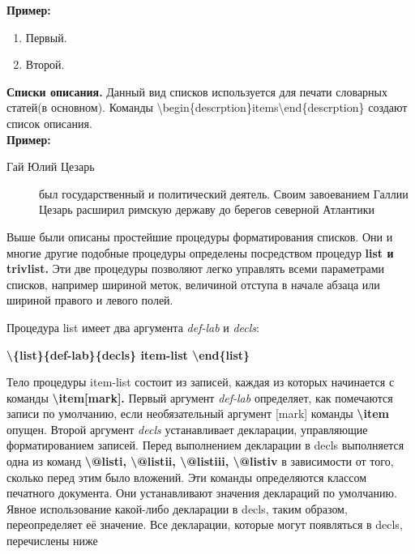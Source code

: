 \documentclass[a4paper,14pt,russian]{extreport}
\begin{document}
\newpage

\textbf{Пример:}
\begin{enumerate}%
\item Первый.%
\item Второй.%
\end{enumerate}%

\textbf{Списки описания.}
Данный вид списков используется для печати словарных статей(в основном). Команды \textbackslash begin\{descrption\}items\textbackslash end\{descrption\}
создают список описания.\\
\textbf{Пример:}
\begin{description} %
\item[Гай Юлий Цезарь] был государственный и политический деятель.
  Своим завоеванием Галлии Цезарь расширил римскую державу до берегов северной Атлантики
\end{description} %


Выше были описаны простейшие процедуры форматирования списков. Они и многие другие подобные процедуры определены посредством процедур \textbf{list и trivlist.} Эти две процедуры позволяют легко управлять всеми параметрами списков, например шириной меток, величиной отступа в начале абзаца или шириной правого и левого полей.

Процедура list имеет два аргумента \textit{def-lab} и \textit{decls}:

\bigskip
\textbf{\textbackslash \{list\}\{def-lab\}\{decls\} item-list \textbackslash end\{list\}}
\bigskip

Тело процедуры item-list состоит из записей, каждая из которых начинается с команды \textbf{\textbackslash item[mark].} Первый аргумент \textit{def-lab} определяет, как помечаются записи по умолчанию, если необязательный аргумент [mark] команды \textbf{\textbackslash item} опущен. Второй аргумент \textit{decls} устанавливает декларации, управляющие форматированием записей.  Перед выполнением декларации в decls выполняется одна из команд \textbf{\textbackslash @listi, \textbackslash @listii, \textbackslash @listiii, \textbackslash @listiv} в зависимости от того, сколько перед этим было вложений. Эти команды определяются классом печатного документа. Они устанавливают значения деклараций по умолчанию. Явное использование какой-либо декларации в decls, таким образом, переопределяет её значение. Все декларации, которые могут появляться в decls, перечислены ниже
\end{document}
